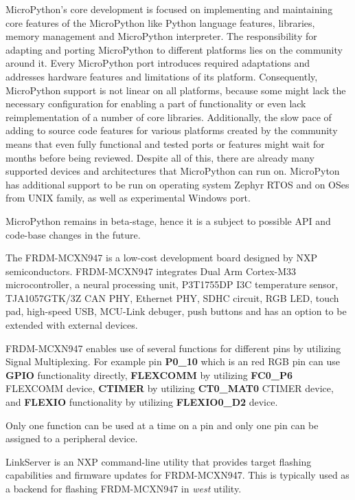 \documentclass[twoside, 12pt]{article}
\begin{document}
MicroPython's core development is focused on implementing and maintaining core features
of the MicroPython like Python language features, libraries, memory management and 
MicroPython interpreter. The responsibility for adapting and porting MicroPython to different
platforms lies on the community around it. Every MicroPython port introduces required 
adaptations and addresses hardware features and limitations of its platform. Consequently,
MicroPython support is not linear on all platforms, because some might lack the necessary
configuration for enabling a part of functionality or even lack reimplementation of a number of core libraries. Additionally, the slow pace of adding to source code features for various platforms 
created by the community means that
even fully functional and tested ports or features might wait for months before being reviewed.
Despite all of this, there are already many supported devices and architectures that 
MicroPython can run on. MicroPyton has additional support to be run on
operating system Zephyr RTOS and on OSes from UNIX family, as well as experimental Windows 
port.

MicroPython remains in beta-stage, hence it is a subject to possible API and code-base changes in the future.\cite{mpy_book}

The FRDM-MCXN947 is a low-cost development board designed by NXP semiconductors. FRDM-MCXN947 
integrates Dual Arm
Cortex-M33 microcontroller, a neural processing unit, P3T1755DP I3C temperature sensor, 
TJA1057GTK/3Z CAN PHY, Ethernet PHY, SDHC circuit, RGB LED, touch pad, high-speed USB, MCU-Link debuger,
push buttons and has an option to be extended with external devices.
\cite{mcxn947_manual}

\obrazek
{}

FRDM-MCXN947 enables use of several functions for different pins by utilizing Signal 
Multiplexing. For example pin \textbf{P0\_10} which is an red RGB pin can use \textbf{GPIO} 
functionality directly, \textbf{FLEXCOMM} by utilizing \textbf{FC0\_P6} FLEXCOMM device,
\textbf{CTIMER} by utilizing \textbf{CT0\_MAT0} CTIMER device, and \textbf{FLEXIO} 
functionality by utilizing \textbf{FLEXIO0\_D2} device.

Only one function can be used at a time on a pin and only one pin can be assigned to a 
peripheral device. \cite{mcx_manual} 

LinkServer is an NXP command-line utility that provides  target flashing capabilities and 
firmware updates for FRDM-MCXN947. This is typically used as a backend for flashing FRDM-MCXN947 in \textit{west} utility. \cite{link_server}
\end{document}
